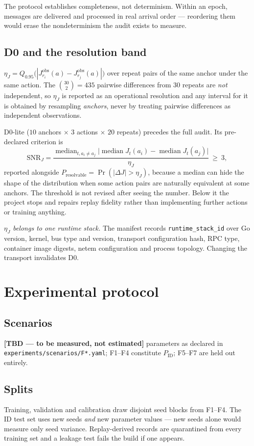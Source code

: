 \documentclass[journal]{IEEEtran}
\newcommand{\TBD}{\textbf{[TBD --- to be measured, not estimated]}}
\begin{document}
The protocol establishes completeness, not determinism. Within an epoch,
messages are delivered and processed in real arrival order --- reordering them
would erase the nondeterminism the audit exists to measure.

\subsection{D0 and the resolution band}
$\eta_J=Q_{0.95}\bigl(|J^{\mathrm{obs}}_{r_i}(a)-J^{\mathrm{obs}}_{r_j}(a)|\bigr)$
over repeat pairs of the same anchor under the same action. The
$\binom{30}{2}=435$ pairwise differences from $30$ repeats are \emph{not}
independent, so $\eta_J$ is reported as an operational resolution and any
interval for it is obtained by resampling \emph{anchors}, never by treating
pairwise differences as independent observations.

D0-lite ($10$ anchors $\times$ $3$ actions $\times$ $20$ repeats) precedes the
full audit. Its pre-declared criterion is
\[
\mathrm{SNR}_J=\frac{\operatorname{median}_{t,a_i\neq a_j}
\bigl|\operatorname{median}J_t(a_i)-\operatorname{median}J_t(a_j)\bigr|}{\eta_J}
\ \ge\ 3 ,
\]
reported alongside $P_{\mathrm{resolvable}}=\Pr(|\Delta J|>\eta_J)$, because a
median can hide the shape of the distribution when some action pairs are
naturally equivalent at some anchors. The threshold is not revised after seeing
the number. Below it the project stops and repairs replay fidelity rather than
implementing further actions or training anything.

\emph{$\eta_J$ belongs to one runtime stack.} The manifest records
\texttt{runtime\_stack\_id} over Go version, kernel, bus type and version,
transport configuration hash, RPC type, container image digests, netem
configuration and process topology. Changing the transport invalidates D0.

\section{Experimental protocol}
\subsection{Scenarios} \TBD{} parameters as declared in
\texttt{experiments/scenarios/F*.yaml}; F1--F4 constitute $P_{\mathrm{ID}}$;
F5--F7 are held out entirely.

\subsection{Splits} Training, validation and calibration draw disjoint seed
blocks from F1--F4. The ID test set uses new seeds \emph{and} new parameter
values --- new seeds alone would measure only seed variance. Replay-derived
records are quarantined from every training set and a leakage test fails the
build if one appears.
\end{document}
